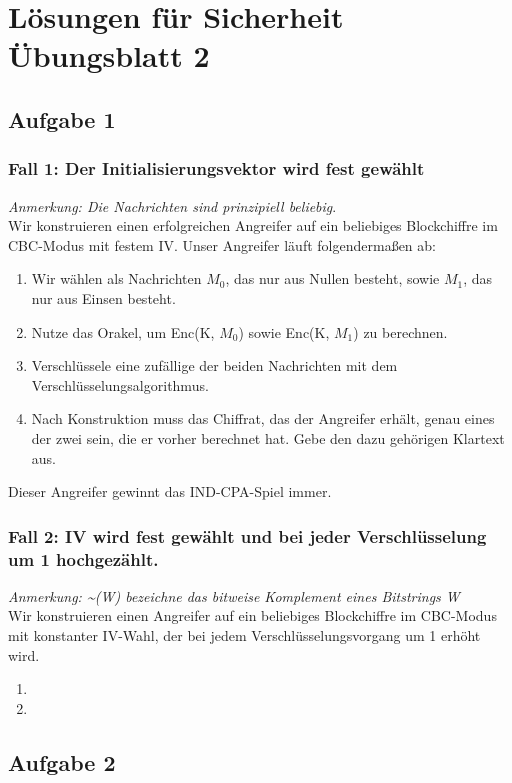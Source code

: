 \documentclass[12pt]{article}
\begin{document}
\section*{L\"osungen f\"ur Sicherheit \"Ubungsblatt 2}
\subsection*{Aufgabe 1}
\subsubsection*{Fall 1: Der Initialisierungsvektor wird fest gewählt}
\emph{Anmerkung: Die Nachrichten sind prinzipiell beliebig}.\\
Wir konstruieren einen erfolgreichen Angreifer auf ein beliebiges Blockchiffre im CBC-Modus mit festem IV.
Unser Angreifer läuft folgendermaßen ab:
\begin{enumerate}
  \item Wir w\"ahlen als Nachrichten $M_0$, das nur aus Nullen besteht, sowie $M_1$, das nur aus Einsen besteht.
  \item Nutze das Orakel, um Enc(K, $M_0$) sowie Enc(K, $M_1$) zu berechnen.
  \item Verschl\"ussele eine zuf\"allige der beiden Nachrichten mit dem Verschl\"usselungsalgorithmus.
  \item Nach Konstruktion muss das Chiffrat, das der Angreifer erhält, genau eines der zwei sein, die er vorher berechnet hat. Gebe den dazu geh\"origen Klartext aus.
\end{enumerate}
Dieser Angreifer gewinnt das IND-CPA-Spiel immer.

\subsubsection*{Fall 2: IV wird fest gewählt und bei jeder Verschlüsselung um 1 hochgezählt.}
\emph{Anmerkung: \textasciitilde{}(W) bezeichne das bitweise Komplement eines Bitstrings W}\\
Wir konstruieren einen Angreifer auf ein beliebiges Blockchiffre im CBC-Modus mit konstanter IV-Wahl, der bei jedem Verschlüsselungsvorgang um 1 erhöht wird.
\begin{enumerate}
  \item
  \item
\end{enumerate}
\subsection*{Aufgabe 2}
\end{document}
